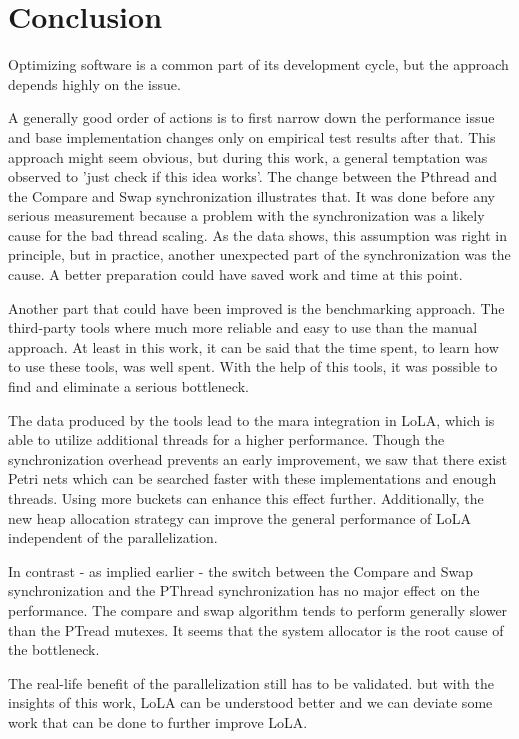 \chapter{Conclusion}
Optimizing software is a common part of its development cycle, but the approach depends highly on the issue.

A generally good order of actions is to first narrow down the performance issue and base implementation changes only on empirical test results after that. This approach might seem obvious, but during this work, a general temptation was observed to 'just check if this idea works'. The change between the Pthread and the Compare and Swap synchronization illustrates that. It was done before any serious measurement because a problem with the synchronization was a likely cause for the bad thread scaling. As the data shows, this assumption was right in principle, but in practice, another unexpected part of the synchronization was the cause. A better preparation could have saved work and time at this point.

Another part that could have been improved is the benchmarking approach. The third-party tools where much more reliable and easy to use than the manual approach. At least in this work, it can be said that the time spent, to learn how to use these tools, was well spent. With the help of this tools, it was possible to find and eliminate a serious bottleneck.

The data produced by the tools lead to the mara integration in LoLA, which is able to utilize additional threads for a higher performance. Though the synchronization overhead prevents an early improvement, we saw that there exist Petri nets which can be searched faster with these implementations and enough threads. Using more buckets can enhance this effect further. Additionally, the new heap allocation strategy can improve the general performance of LoLA independent of the parallelization.

In contrast - as implied earlier - the switch between the Compare and Swap synchronization and the PThread synchronization has no major effect on the performance. The compare and swap algorithm tends to perform generally slower than the PTread mutexes. It seems that the system allocator is the root cause of the bottleneck.

The real-life benefit of the parallelization still has to be validated. but with the insights of this work, LoLA can be understood better and we can deviate some work that can be done to further improve LoLA. 